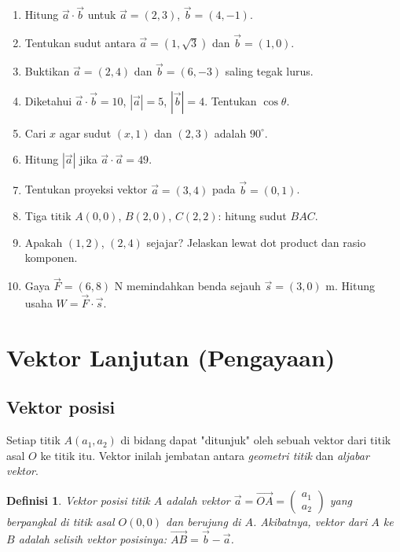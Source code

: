\documentclass[11pt,a4paper]{report}
\theoremstyle{gaya}
\newtheorem{definisi}{Definisi}[chapter]
\begin{document}
\begin{latihan}
\begin{enumerate}[leftmargin=*]
  \item Hitung $\vec a\cdot\vec b$ untuk $\vec a=(2,3)$, $\vec b=(4,-1)$.
  \item Tentukan sudut antara $\vec a=(1,\sqrt3)$ dan $\vec b=(1,0)$.
  \item Buktikan $\vec a=(2,4)$ dan $\vec b=(6,-3)$ saling tegak lurus.
  \item Diketahui $\vec a\cdot\vec b=10$, $|\vec a|=5$, $|\vec b|=4$. Tentukan $\cos\theta$.
  \item Cari $x$ agar sudut $(x,1)$ dan $(2,3)$ adalah $90^\circ$.
  \item Hitung $|\vec a|$ jika $\vec a\cdot\vec a=49$.
  \item Tentukan proyeksi vektor $\vec a=(3,4)$ pada $\vec b=(0,1)$.
  \item Tiga titik $A(0,0)$, $B(2,0)$, $C(2,2)$: hitung sudut $BAC$.
  \item Apakah $(1,2)$, $(2,4)$ sejajar? Jelaskan lewat dot product dan rasio komponen.
  \item Gaya $\vec F=(6,8)$ N memindahkan benda sejauh $\vec s=(3,0)$ m. Hitung usaha $W=\vec F\cdot\vec s$.
\end{enumerate}
\end{latihan}

\section{Vektor Lanjutan (Pengayaan)}

\subsection*{Vektor posisi}
Setiap titik $A(a_1,a_2)$ di bidang dapat "ditunjuk" oleh sebuah vektor dari titik asal $O$ ke titik itu. Vektor inilah jembatan antara \emph{geometri titik} dan \emph{aljabar vektor}.

\begin{definisi}
\emph{Vektor posisi} titik $A$ adalah vektor $\vec{a}=\vec{OA}=\begin{pmatrix}a_1\\a_2\end{pmatrix}$ yang berpangkal di titik asal $O(0,0)$ dan berujung di $A$. Akibatnya, vektor dari $A$ ke $B$ adalah selisih vektor posisinya: $\vec{AB}=\vec{b}-\vec{a}$.
\end{definisi}
\end{document}
